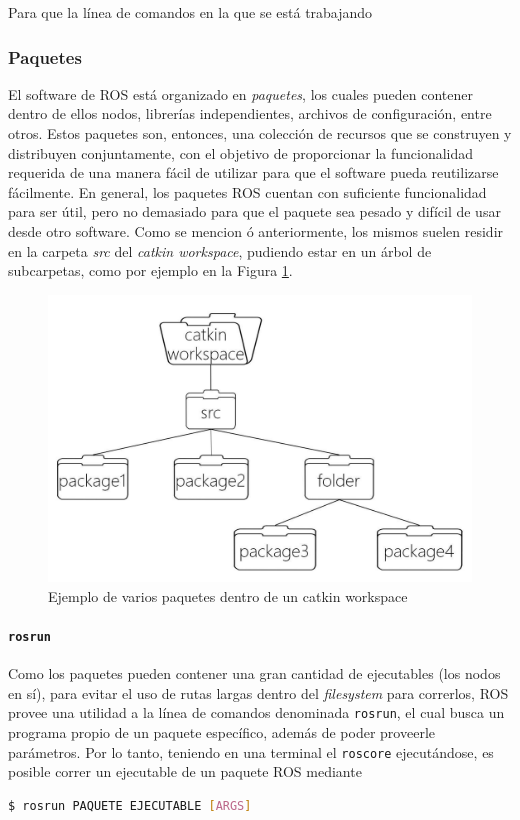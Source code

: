 Para que la línea de comandos en la que se está trabajando
\subsubsection{Paquetes}
El software de ROS está organizado en \textit{paquetes}, los cuales pueden contener dentro de ellos nodos, librerías independientes, archivos de configuración, entre otros. Estos paquetes son, entonces, una colección de recursos que se construyen y distribuyen conjuntamente, con el objetivo de proporcionar la funcionalidad requerida de una manera fácil de utilizar para que el software pueda reutilizarse fácilmente. En general, los paquetes ROS cuentan con suficiente funcionalidad para ser útil, pero no demasiado para que el paquete sea pesado y difícil de usar desde otro software. Como se mencion
ó anteriormente, los mismos suelen residir en la carpeta \textit{src} del \textit{catkin workspace}, pudiendo estar en un árbol de subcarpetas, como por ejemplo en la Figura \ref{fig:catkinworkspacewithpackages}.
\begin{figure}[!ht]
    \centering
    \includegraphics[width=\textwidth]{Img/CatkinWorkspaceWithPackages.jpeg}
    \caption{Ejemplo de varios paquetes dentro de un catkin workspace}
    \label{fig:catkinworkspacewithpackages}
\end{figure}

\paragraph{\texttt{rosrun}}
Como los paquetes pueden contener una gran cantidad de ejecutables (los nodos en sí), para evitar el uso de rutas largas dentro del \textit{filesystem} para correrlos, ROS provee una utilidad a la línea de comandos denominada \texttt{rosrun}, el cual busca un programa propio de un paquete específico, además de poder proveerle parámetros. Por lo tanto, teniendo en una terminal el \texttt{roscore} ejecutándose, es posible correr un ejecutable de un paquete ROS mediante
\begin{lstlisting}[language=bash]
  $ rosrun PAQUETE EJECUTABLE [ARGS]
\end{lstlisting}

